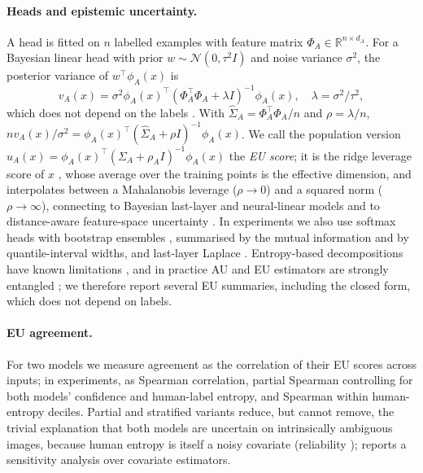 \documentclass[twoside]{article}
\theoremstyle{definition}
\theoremstyle{remark}
\newcommand{\R}{\mathbb{R}}
\begin{document}
\paragraph{Heads and epistemic uncertainty.}
A head is fitted on $n$ labelled examples with feature matrix $\Phi_A\in\R^{n\times d_A}$.
For a Bayesian linear head with prior $w\sim\mathcal N(0,\tau^2 I)$ and noise variance $\sigma^2$, the posterior variance of $w^\top\phi_A(x)$ is
\begin{equation}
v_A(x)=\sigma^2\phi_A(x)^\top(\Phi_A^\top\Phi_A+\lambda I)^{-1}\phi_A(x),\quad \lambda=\sigma^2/\tau^2,
\label{eq:blr}
\end{equation}
which does not depend on the labels \citep{rasmussen2006gpml}.
With $\hat\Sigma_A=\Phi_A^\top\Phi_A/n$ and $\rho=\lambda/n$, $n v_A(x)/\sigma^2=\phi_A(x)^\top(\hat\Sigma_A+\rho I)^{-1}\phi_A(x)$.
We call the population version $u_A(x)=\phi_A(x)^\top(\Sigma_A+\rho_A I)^{-1}\phi_A(x)$ the \emph{EU score}; it is the ridge leverage score of $x$ \citep{alaoui2015ridge}, whose average over the training points is the effective dimension, and interpolates between a Mahalanobis leverage ($\rho\to0$) and a squared norm ($\rho\to\infty$), connecting to Bayesian last-layer and neural-linear models \citep{snoek2015scalable,riquelme2018showdown} and to distance-aware feature-space uncertainty \citep{lee2018mahalanobis,vanamersfoort2020duq,liu2020sngp,mukhoti2023ddu}.
In experiments we also use softmax heads with bootstrap ensembles \citep{efron1993bootstrap,lakshminarayanan2017ensembles}, summarised by the mutual information \citep{houlsby2011bald} and by quantile-interval widths, and last-layer Laplace \citep{daxberger2021laplace}.
Entropy-based decompositions have known limitations \citep{wimmer2023quantifying}, and in practice AU and EU estimators are strongly entangled \citep{mucsanyi2024benchmarking}; we therefore report several EU summaries, including the closed form, which does not depend on labels.

\paragraph{EU agreement.}
For two models we measure agreement as the correlation of their EU scores across inputs; in experiments, as Spearman correlation, partial Spearman controlling for both models' confidence and human-label entropy, and Spearman within human-entropy deciles.
Partial and stratified variants reduce, but cannot remove, the trivial explanation that both models are uncertain on intrinsically ambiguous images, because human entropy is itself a noisy covariate (reliability \CeilingCIFARh{});  reports a sensitivity analysis over covariate estimators.
\end{document}
